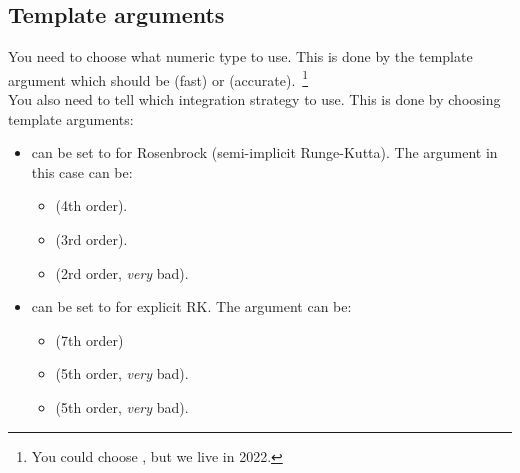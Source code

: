 \documentclass[10pt,utf8,compress,xcolor=dvipsnames]{beamer}
\begin{document}
\subsection{Template arguments}
\begin{frame}[fragile]{\insertsubsectionhead}
	You need to choose what numeric type to use. This is done by the template argument  which should be  (fast) or  (accurate).~\footnote{\fontF You could choose , but we live in 2022.}\\[0.5cm]
	
	
	You also need to tell \mimes which integration strategy to use. This is done by choosing template arguments:
	\begin{itemize}
		\item {} can be set to  for Rosenbrock (semi-implicit Runge-Kutta). 
		The  argument in this case can be:\\[-0.0cm]
		\begin{itemize}
			\item {} (4th order).
			\item {} (3rd order).
			\item {} (2rd order, {\em very} bad).
		\end{itemize}
		\item {} can be set to  for explicit RK.
		The  argument can be:\\[-0.0cm]
		\begin{itemize}
			\item {} (7th order)
			\item {} (5th order, {\em very} bad).
			\item {} (5th order, {\em very} bad).
		\end{itemize}	
	\end{itemize}
\end{frame}
\end{document}

